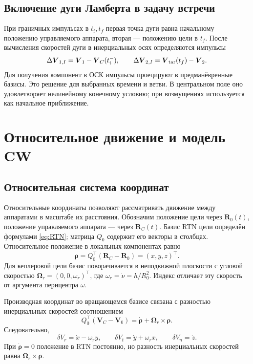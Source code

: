\documentclass[a4paper,11pt]{article}
\numberwithin{equation}{section}
\theoremstyle{remark}
\newcommand{\vect}[1]{\boldsymbol{#1}}
\begin{document}
\subsection{Включение дуги Ламберта в задачу встречи}

При граничных импульсах в $t_i,t_f$ первая точка дуги равна
начальному положению управляемого аппарата, вторая ---
положению цели в $t_f$. После вычисления скоростей дуги
в инерциальных осях определяются импульсы
\begin{equation}
 \Delta\vect V_{1,I}=\vect V_1-\vect V_C(t_i^-),\qquad
 \Delta\vect V_{2,I}=\vect V_{\rm tar}(t_f)-\vect V_2.
 \label{eq:lambert-rendezvous-control}
\end{equation}
Для получения компонент в ОСК импульсы проецируют
в предманёвренные базисы. Это решение для выбранных
времени и ветви. В центральном поле оно удовлетворяет
нелинейному конечному условию; при возмущениях
используется как начальное приближение.

\FloatBarrier
\section{Относительное движение и модель CW}
\label{sec:cw}

\subsection{Относительная система координат}

Относительные координаты позволяют рассматривать движение
между аппаратами в масштабе их расстояния.
Обозначим положение цели через $\vect R_0(t)$,
положение управляемого аппарата --- через $\vect R_C(t)$.
Базис RTN цели определён формулами \eqref{eq:RTN}; матрица
$Q_0$ содержит его векторы в столбцах. Относительное положение
в локальных компонентах равно
\begin{equation}
 \vect\rho=Q_0^\top(\vect R_C-\vect R_0)
           =(x,y,z)^\top.
 \label{eq:relative-position}
\end{equation}
Для кеплеровой цели базис поворачивается в неподвижной
плоскости с угловой скоростью
$\vect\Omega_r=(0,0,\omega_r)^\top$,
где $\omega_r=\dot\nu=h/R_0^2$.
Индекс отличает эту скорость от аргумента перицентра $\omega$.

Производная координат во вращающемся базисе связана
с разностью инерциальных скоростей соотношением
\begin{equation}
 Q_0^\top(\vect V_C-\vect V_0)
 =\dot{\vect\rho}+\vect\Omega_r\times\vect\rho.
 \label{eq:relative-velocity}
\end{equation}
Следовательно,
\begin{equation}
 \delta V_r=\dot x-\omega_r y,\qquad
 \delta V_t=\dot y+\omega_r x,\qquad
 \delta V_n=\dot z.
 \label{eq:velocity-components-relative}
\end{equation}
При $\dot{\vect\rho}=0$ положение в RTN постоянно,
но разность инерциальных скоростей равна
$\vect\Omega_r\times\vect\rho$.
\end{document}
